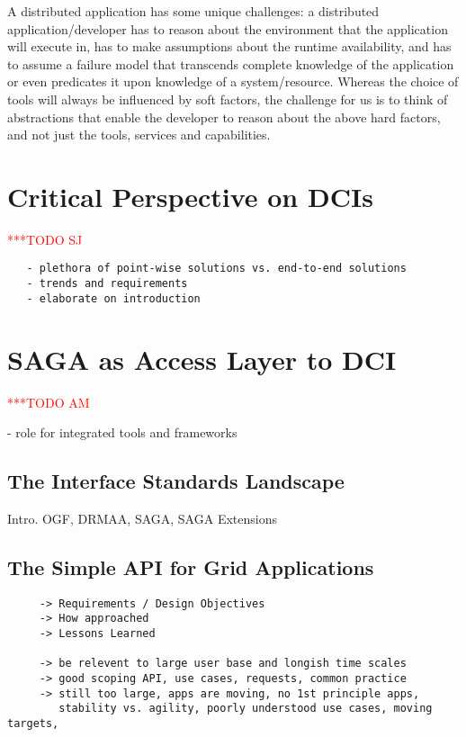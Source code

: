 \documentclass[a4paper,10pt]{article}
\newcommand{\todo}[1]{     {\textcolor{red}  { ***TODO      #1 }}}
\newcommand{\todo}[1]{}
\begin{document}
A distributed application has some unique challenges: a distributed
application/developer has to reason about the environment that the
application will execute in, has to make assumptions about the runtime
availability, and has to assume a failure model that transcends
complete knowledge of the application or even predicates it upon
knowledge of a system/resource.  Whereas the choice of tools will
always be influenced by soft factors, the challenge for us is to think
of abstractions that enable the developer to reason about the above
hard factors, and not just the tools, services and capabilities.



\section{Critical Perspective on DCIs}
\todo{SJ}

 \begin{verbatim}
   - plethora of point-wise solutions vs. end-to-end solutions
   - trends and requirements
   - elaborate on introduction
 \end{verbatim}



\section{SAGA as Access Layer to DCI}
\todo{AM}

 - role for integrated tools and frameworks


 \subsection{The Interface Standards Landscape}
 \label{interface_landscape}

  Intro. OGF, DRMAA, SAGA, SAGA Extensions\\

 \subsection{The Simple API for Grid Applications}

  \begin{verbatim}
     -> Requirements / Design Objectives
     -> How approached
     -> Lessons Learned
  
     -> be relevent to large user base and longish time scales
     -> good scoping API, use cases, requests, common practice
     -> still too large, apps are moving, no 1st principle apps,
        stability vs. agility, poorly understood use cases, moving targets, 

  \end{verbatim}
\end{document}

